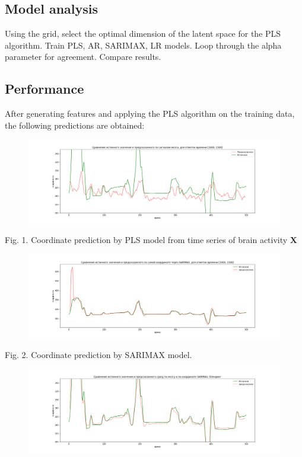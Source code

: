 \documentclass{article}
\begin{document}
\subsection{Model analysis}
Using the grid, select the optimal dimension of the latent space for the PLS algorithm. Train PLS, AR, SARIMAX, LR models. Loop through the alpha parameter for agreement. Compare results.
\subsection{Performance}
After generating features and applying the PLS algorithm on the training data, the following predictions are obtained:

\begin{figure}[H]
\includegraphics[scale=0.34]{images/1.png}
\end{figure}
Fig. 1. Coordinate prediction by PLS model from time series of brain activity $\mathbf{X}$
\begin{figure}[H]
\includegraphics[scale=0.34]{images/2.png}
\end{figure}
Fig. 2. Coordinate prediction by SARIMAX model.
\begin{figure}[H]
\includegraphics[scale=0.34]{images/3.png}
\end{figure}
\end{document}
